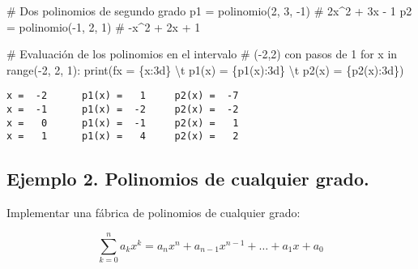\documentclass[
  letterpaper,
  DIV=11,
  numbers=noendperiod]{scrreprt}
\newenvironment{Shaded}{\begin{snugshade}}{\end{snugshade}}
\newcommand{\BuiltInTok}[1]{\textcolor[rgb]{0.00,0.23,0.31}{#1}}
\newcommand{\CharTok}[1]{\textcolor[rgb]{0.13,0.47,0.30}{#1}}
\newcommand{\CommentTok}[1]{\textcolor[rgb]{0.37,0.37,0.37}{#1}}
\newcommand{\ControlFlowTok}[1]{\textcolor[rgb]{0.00,0.23,0.31}{#1}}
\newcommand{\DecValTok}[1]{\textcolor[rgb]{0.68,0.00,0.00}{#1}}
\newcommand{\KeywordTok}[1]{\textcolor[rgb]{0.00,0.23,0.31}{#1}}
\newcommand{\NormalTok}[1]{\textcolor[rgb]{0.00,0.23,0.31}{#1}}
\newcommand{\OperatorTok}[1]{\textcolor[rgb]{0.37,0.37,0.37}{#1}}
\newcommand{\SpecialCharTok}[1]{\textcolor[rgb]{0.37,0.37,0.37}{#1}}
\newcommand{\SpecialStringTok}[1]{\textcolor[rgb]{0.13,0.47,0.30}{#1}}
\begin{document}
\begin{Shaded}
\begin{Highlighting}[]
\CommentTok{\# Dos polinomios de segundo grado}
\NormalTok{p1 }\OperatorTok{=}\NormalTok{ polinomio(}\DecValTok{2}\NormalTok{, }\DecValTok{3}\NormalTok{, }\OperatorTok{{-}}\DecValTok{1}\NormalTok{) }\CommentTok{\# 2x\^{}2 + 3x {-} 1}
\NormalTok{p2 }\OperatorTok{=}\NormalTok{ polinomio(}\OperatorTok{{-}}\DecValTok{1}\NormalTok{, }\DecValTok{2}\NormalTok{, }\DecValTok{1}\NormalTok{) }\CommentTok{\# {-}x\^{}2 + 2x + 1}

\CommentTok{\# Evaluación de los polinomios en el intervalo}
\CommentTok{\# ({-}2,2) con pasos de 1}
\ControlFlowTok{for}\NormalTok{ x }\KeywordTok{in} \BuiltInTok{range}\NormalTok{(}\OperatorTok{{-}}\DecValTok{2}\NormalTok{, }\DecValTok{2}\NormalTok{, }\DecValTok{1}\NormalTok{):}
    \BuiltInTok{print}\NormalTok{(}\SpecialStringTok{f\textquotesingle{}x = }\SpecialCharTok{\{}\NormalTok{x}\SpecialCharTok{:3d\}}\SpecialStringTok{ }\CharTok{\textbackslash{}t}\SpecialStringTok{ p1(x) = }\SpecialCharTok{\{}\NormalTok{p1(x)}\SpecialCharTok{:3d\}}\SpecialStringTok{ }\CharTok{\textbackslash{}t}\SpecialStringTok{ p2(x) = }\SpecialCharTok{\{}\NormalTok{p2(x)}\SpecialCharTok{:3d\}}\SpecialStringTok{\textquotesingle{}}\NormalTok{)}
\end{Highlighting}
\end{Shaded}

\begin{verbatim}
x =  -2      p1(x) =   1     p2(x) =  -7
x =  -1      p1(x) =  -2     p2(x) =  -2
x =   0      p1(x) =  -1     p2(x) =   1
x =   1      p1(x) =   4     p2(x) =   2
\end{verbatim}

\subsection{\texorpdfstring{\textbf{Ejemplo 2. Polinomios de cualquier
grado.}}{Ejemplo 2. Polinomios de cualquier grado.}}\label{ejemplo-2.-polinomios-de-cualquier-grado.}

Implementar una fábrica de polinomios de cualquier grado:

\[
\sum\limits_{k=0}^{n} a_k x^k = a_n x^n + a_{n-1} x^{n-1} + \dots + a_1 x + a_0 
\]
\end{document}
